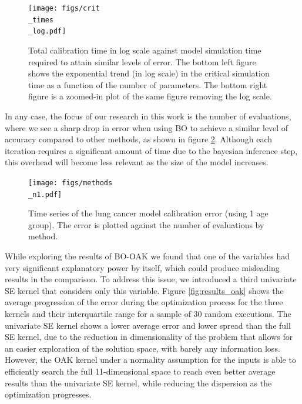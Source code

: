 \documentclass{IOS-Book-Article}
\begin{document}
	\begin{figure}[h!]
		\centering	
		\texttt{[image: figs/crit\\\_times\\\_log.pdf]}		
		\caption{Total calibration time in log scale against model simulation time required to attain similar levels of error. The bottom left figure shows the exponential trend (in log scale) in the critical simulation time as a function of the number of parameters. The bottom right figure is a zoomed-in plot of the same figure removing the log scale.}
		\label{fig:sim_times}	
	\end{figure}
	
	In any case, the focus of our research in this work is the number of evaluations, where we see a sharp drop in error when using BO to achieve a similar level of accuracy compared to other methods, as shown in figure \ref{fig:method_comparison}. Although each iteration requires a significant amount of time due to the bayesian inference step, this overhead will become less relevant as the size of the model increases.
	
	\begin{figure}[h!]
		\centering	
		\texttt{[image: figs/methods\\\_n1.pdf]}		
		\caption{Time series of the lung cancer model calibration error (using 1 age group). The error is plotted against the number of evaluations by method.}
		\label{fig:method_comparison}	
	\end{figure}
	
	While exploring the results of BO-OAK we found that one of the variables had very significant explanatory power by itself, which could produce misleading results in the comparison. To address this issue, we introduced a third univariate SE kernel that considers only this variable. Figure \ref{fig:results_oak} shows the average progression of the error during the optimization process for the three kernels and their interquartile range for a sample of 30 random executions. The univariate SE kernel shows a lower average error and lower spread than the full SE kernel, due to the reduction in dimensionality of the problem that allows for an easier exploration of the solution space, with barely any information loss. However, the OAK kernel under a normality assumption for the inputs is able to efficiently search the full 11-dimensional space to reach even better average results than the univariate SE kernel, while reducing the dispersion as the optimization progresses.
	
\end{document}
